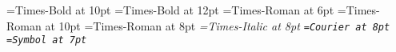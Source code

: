 % 
%
%
\font\bbf=Times-Bold at 10pt
\font\vbbf=Times-Bold at 12pt
\font\smrm=Times-Roman at 6pt
\font\brm=Times-Roman at 10pt
\font\rm=Times-Roman at 8pt
\font\it=Times-Italic at 8pt
\font\tt=Courier at 8pt
\font\sym=Symbol at 7pt
\def\copyright{{\sym\char'323}}
